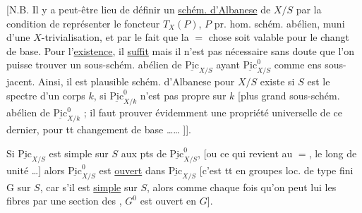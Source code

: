 [N.B. Il y a peut-être lieu de définir
 un \uline{schém. d'Albanese} de $X/S$ par
la condition de représenter le foncteur $T_X(P)$, $P$
pr. hom.  schém. abélien, muni d'une $X$-trivialisation,
et par le fait que la $=$ chose soit valable pour
le changt de base. Pour l'\uline{existence}, il \uline{suffit}
mais il n'est pas nécessaire sans doute que
l'on puisse trouver un sous-schém. abélien
de $\underline{\mathrm{Pic}}_{X/S}$ ayant $\underline{\mathrm{Pic}}^0_{X/S}$ comme ens sous-jacent.
Ainsi, il est plausible  schém. d'Albanese
pour $X/S$ existe si $S$ est le spectre d'un corps
$k$,  si $\underline{\mathrm{Pic}}^0_{X/k}$ n'est pas propre sur $k$
[plus grand sous-schém. abélien de $\underline{\mathrm{Pic}}^0_{X/k}$ ; il faut
prouver évidemment une propriété universelle de
ce dernier, pour tt changement de base \ldots\ldots{} ]].

  Si $\underline{\mathrm{Pic}}_{X/S}$ est simple sur $S$ aux pts de $\underline{\mathrm{Pic}}^0_{X/S}$,  [ou ce
qui revient au $=$, le long de  unité \ldots{}]
  alors
$\underline{\mathrm{Pic}}^0_{X/S}$ est \uline{ouvert} dans $\underline{\mathrm{Pic}}_{X/S}$ [c'est  tt  en
groupes loc. de type fini G sur $S$, car s'il est \uline{simple} sur $S$,
alors  comme chaque fois qu'on peut lui 
  les fibres par une section des 
  ,
$G^0$ est ouvert en $G$].

